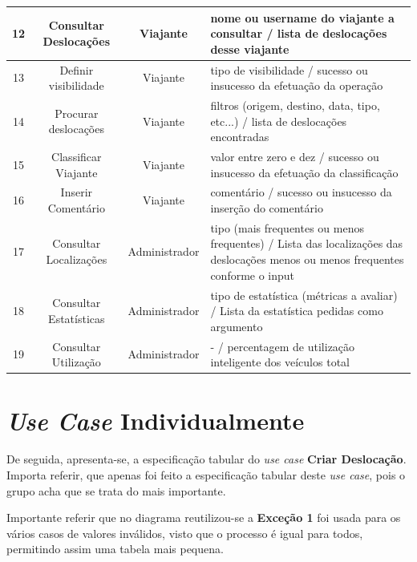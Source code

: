 \begin{table}[H]
\begin{center}
\begin{tabularx}{\textwidth}{ | c | c | c | X | }
    \hline
    12 & Consultar Deslocações & Viajante & nome ou username do viajante a consultar / lista de deslocações desse viajante \\
    
    \hline
    13 & Definir visibilidade & Viajante & tipo de visibilidade / sucesso ou insucesso da efetuação da operação \\
    
    \hline
    14 & Procurar deslocações & Viajante & filtros (origem, destino, data, tipo, etc...) / lista de deslocações encontradas \\
    
     \hline
    15 & Classificar Viajante & Viajante & valor entre zero e dez / sucesso ou insucesso da efetuação da classificação \\
    
     \hline
    16 & Inserir Comentário & Viajante & comentário / sucesso ou insucesso da inserção do comentário \\
    
     \hline
    17 & Consultar Localizações & Administrador & tipo (mais frequentes ou menos frequentes) / Lista das localizações das deslocações menos ou menos frequentes conforme o input \\
    
     \hline
    18 & Consultar Estatísticas & Administrador & tipo de estatística (métricas a avaliar) / Lista da estatística pedidas como argumento \\
    
    \hline
    19 & Consultar Utilização & Administrador & - / percentagem de utilização inteligente dos veículos total \\
    
    \hline
\end{tabularx}
\end{center}
\label{tab:r1}
\end{table}

\section{\emph{Use Case} Individualmente}

\hspace{5mm} De seguida, apresenta-se, a especificação tabular do \emph{use case} \textbf{Criar Deslocação}. Importa referir, que apenas foi feito a especificação tabular deste \emph{use case}, pois o grupo acha que se trata do mais importante.

\hspace{5mm} Importante referir que no diagrama reutilizou-se a \textbf{Exceção 1} foi usada para os vários casos de valores inválidos, visto que o processo é igual para todos, permitindo assim uma tabela mais pequena.

